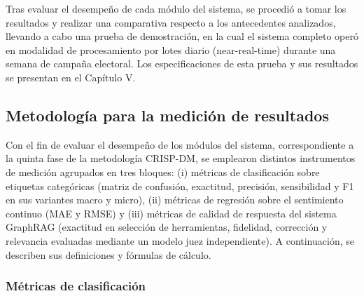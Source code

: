 Tras evaluar el desempeño de cada módulo del sistema, se procedió a tomar los resultados y realizar una comparativa respecto a los antecedentes analizados, llevando a cabo una prueba de demostración, en la cual el sistema completo operó en modalidad de procesamiento por lotes diario (near-real-time) durante una semana de campaña electoral. Los especificaciones de esta prueba y sus resultados se presentan en el Capítulo V.
 
\subsection{Metodología para la medición de resultados}
\label{4:metricas-resultados}

Con el fin de evaluar el desempeño de los módulos del sistema, correspondiente a la quinta fase de la metodología CRISP-DM, se emplearon distintos instrumentos de medición agrupados en tres bloques: (i) métricas de clasificación sobre etiquetas categóricas (matriz de confusión, exactitud, precisión, sensibilidad y F1 en sus variantes macro y micro), (ii) métricas de regresión sobre el sentimiento continuo (MAE y RMSE) y (iii) métricas de calidad de respuesta del sistema GraphRAG (exactitud en selección de herramientas, fidelidad, corrección y relevancia evaluadas mediante un modelo juez independiente). A continuación, se describen sus definiciones y fórmulas de cálculo.

\subsubsection*{Métricas de clasificación}

